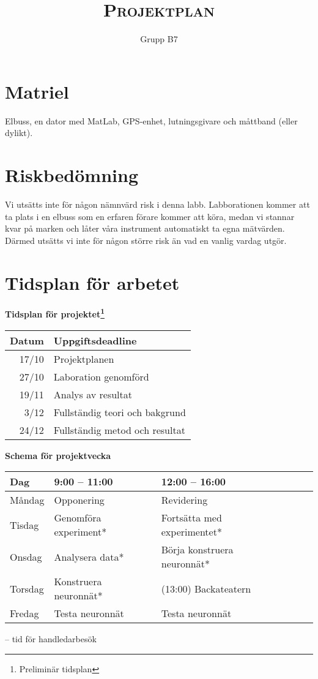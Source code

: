 \documentclass[]{article}
\title{{\huge \textsc{Projektplan}}}
\author{Grupp B7}
\begin{document}
\maketitle
{}
\tableofcontents
\cleardoublepage
{}



\section{Matriel}
Elbuss, en dator med MatLab, GPS-enhet, lutningsgivare och
måttband (eller dylikt).



\section{Riskbedömning}
Vi utsätts inte för någon nämnvärd risk i denna labb.
Labborationen kommer att ta plats i en elbuss som en erfaren förare kommer att köra,
medan vi stannar kvar på marken och låter våra instrument automatiskt ta egna mätvärden.
Därmed utsätts vi inte för någon större risk än vad en vanlig vardag utgör.

\section{Tidsplan för arbetet}
\begin{center}
	{\textbf{Tidsplan för projektet\footnote{Preliminär tidsplan}}} \par
	\begin{tabular}{r | l}
		Datum & Uppgiftsdeadline \\ \hline
		17/10 & Projektplanen \\
		27/10 & Laboration genomförd \\
		19/11 & Analys av resultat \\
		3/12 & Fullständig teori och bakgrund \\
		24/12 & Fullständig metod och resultat \\
		\hline
	\end{tabular} \par

	\vspace{0.75cm}

	{\textbf{Schema för projektvecka}} \par
	\begin{tabular}{l | l l l l l}
		Dag & 9:00 -- 11:00 & 12:00 -- 16:00 \\ \hline
		Måndag & Opponering & Revidering \\
		Tisdag & Genomföra experiment* & Fortsätta med experimentet* \\
		Onsdag & Analysera data* & Börja konstruera neuronnät* \\
		Torsdag & Konstruera neuronnät* & (13:00) Backateatern \\
		Fredag & Testa neuronnät & Testa neuronnät \\
		\hline
	\end{tabular} \par
	\hfill {\scriptsize * -- tid för handledarbesök}
\end{center}

\clearpage
\printbibliography
\end{document}
